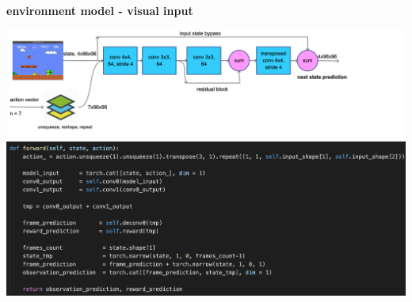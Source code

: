 \documentclass[xcolor=dvipsnames]{beamer}
\begin{document}
\begin{frame}{\bf environment model - visual input}

  {\centering \includegraphics[scale=0.12]{../diagrams/convcuriositydetail.png}}
  {\centering \includegraphics[scale=0.3]{../images/curiosity_conv.png}}

\end{frame}
\end{document}

